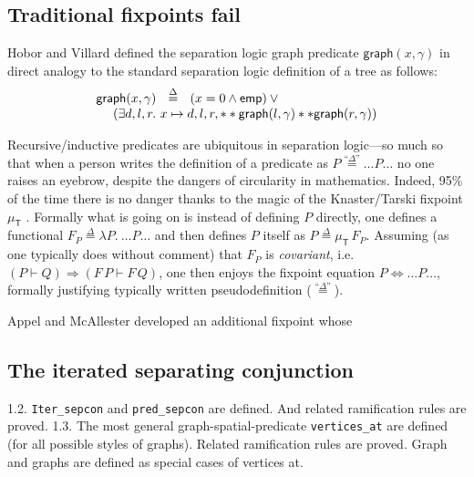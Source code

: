 \documentclass[pldi]{sigplanconf-pldi15}
\begin{document}
\subsection{Traditional fixpoints fail}

Hobor and Villard defined the separation logic graph predicate $\mathsf{graph}(x,\gamma)$ in direct analogy to the standard 
separation logic definition of a tree as follows:
\[
\begin{array}{l}
\mathsf{graph}(x,\gamma) ~~ \stackrel{\Delta}{=} ~~ ({x = 0} \wedge \mathsf{emp}) \vee \null \\
~~~~ (\exists d,l,r.~ x \mapsto d,l,r, ** \mathsf{graph}(l,\gamma) ** \mathsf{graph}(r,\gamma))
\end{array}
\]


Recursive/inductive predicates are ubiquitous in separation logic---so much so that when a person writes the definition of a 
predicate as $P \stackrel{\textrm{``}\Delta\textrm{''}}{=} \ldots P \ldots$ no one raises an eyebrow, despite the dangers of circularity in
mathematics.  Indeed, 95\% of the time there is no danger thanks to the magic of the Knaster/Tarski fixpoint $\mu_{\mathsf{T}}$ \cite{tarski:fixpoint}.
Formally what is going on is instead of defining $P$ directly, one defines a functional 
$F_P \stackrel{\Delta}{=} \lambda P.~ \ldots P \ldots$ and then defines $P$ itself as $P \stackrel{\Delta}{=} \mu_{\mathsf{T}} \, F_P$.  
Assuming (as one typically does without comment) that $F_P$ is \emph{covariant}, i.e. $(P \vdash Q) \Rightarrow (F \, P \vdash F \, Q)$, 
one then enjoys the fixpoint equation
$P \Leftrightarrow \ldots P \ldots$, formally justifying typically written pseudodefinition ($\stackrel{\textrm{``}\Delta\textrm{''}}{=}$).





Appel and McAllester developed an additional fixpoint \cite{appel:fixpoint} whose \cite{appel:vmm}

\subsection{The iterated separating conjunction}
1.2. \texttt{Iter\_sepcon} and \texttt{pred\_sepcon} are defined. And related ramification rules are proved.
1.3. The most general graph-spatial-predicate \texttt{vertices\_at} are defined (for all possible styles of graphs). Related ramification rules are proved. Graph and graphs are defined as special cases of vertices at.
\end{document}
